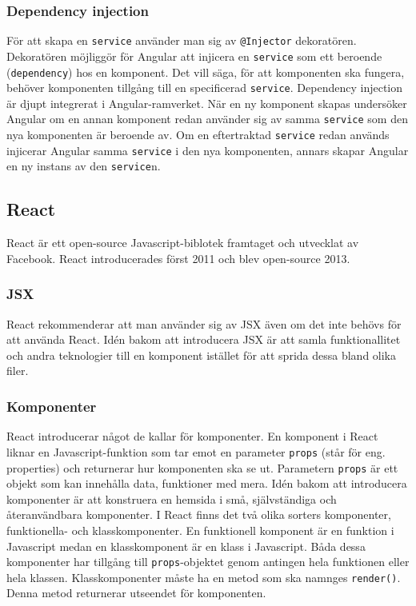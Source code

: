 
\subsubsection{Dependency injection}
För att skapa en \texttt{service} använder man sig av \texttt{@Injector} dekoratören. Dekoratören möjliggör för Angular att injicera en \texttt{service} som ett beroende (\texttt{dependency}) hos en komponent. Det vill säga, för att komponenten ska fungera, behöver komponenten tillgång till en specificerad \texttt{service}. Dependency injection är djupt integrerat i Angular-ramverket. När en ny komponent skapas undersöker Angular om en annan komponent redan använder sig av samma \texttt{service} som den nya komponenten är beroende av. Om en eftertraktad \texttt{service} redan används injicerar Angular samma \texttt{service} i den nya komponenten, annars skapar Angular en ny instans av den \texttt{service}n. \cite{angular-services}


\subsection{React}
\label{axel:react}
React är ett open-source Javascript-biblotek framtaget och utvecklat av Facebook. React introducerades först 2011 och blev open-source 2013. \cite{react-date}


\subsubsection{JSX}
React rekommenderar att man använder sig av JSX även om det inte behövs för att använda React. Idén bakom att introducera JSX är att samla funktionallitet och andra teknologier till en komponent istället för att sprida dessa bland olika filer. \cite{react-jsx}


\subsubsection{Komponenter}
React introducerar något de kallar för komponenter. En komponent i React liknar en Javascript-funktion som tar emot en parameter \texttt{props} (står för eng. properties) och returnerar hur komponenten ska se ut. Parametern \texttt{props} är ett objekt som kan innehålla data, funktioner med mera. Idén bakom att introducera komponenter är att konstruera en hemsida i små, självständiga och återanvändbara komponenter. \cite{react-components} I React finns det två olika sorters komponenter, funktionella- och klasskomponenter. En funktionell komponent är en funktion i Javascript medan en klasskomponent är en klass i Javascript. Båda dessa komponenter har tillgång till \texttt{props}-objektet genom antingen hela funktionen eller hela klassen. Klasskomponenter måste ha en metod som ska namnges \texttt{render()}. Denna metod returnerar utseendet för komponenten.

